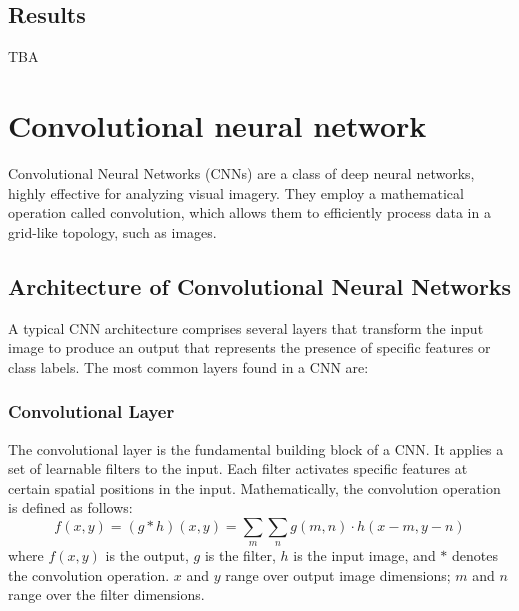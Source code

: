 \subsection{Results}
TBA





























\section{Convolutional neural network}
Convolutional Neural Networks (CNNs) \cite{convolutional_neural_network} are a class of deep neural networks, highly effective for analyzing visual imagery. They employ a mathematical operation called convolution, which allows them to efficiently process data in a grid-like topology, such as images.

\subsection{Architecture of Convolutional Neural Networks}
A typical CNN architecture comprises several layers that transform the input image to produce an output that represents the presence of specific features or class labels. The most common layers found in a CNN are:

\subsubsection{Convolutional Layer}
The convolutional layer is the fundamental building block of a CNN. It applies a set of learnable filters to the input. Each filter activates specific features at certain spatial positions in the input. Mathematically, the convolution operation is defined as follows:
\[f(x, y) = (g * h)(x, y) = \sum_m\sum_n g(m,n) \cdot h(x-m, y-n)\]
where \(f(x, y)\) is the output, \(g\) is the filter, \(h\) is the input image, and \(*\) denotes the convolution operation. \(x\) and \(y\) range over output image dimensions; \(m\) and \(n\) range over the filter dimensions.

